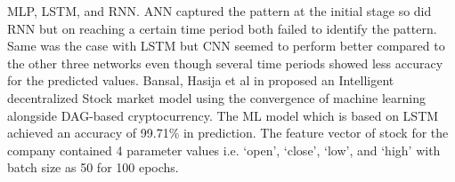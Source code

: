 \documentclass[conference]{IEEEtran}
\begin{document}
MLP, LSTM, and RNN. ANN captured the pattern at the initial stage so did RNN but on reaching a certain time period both failed to identify the pattern. Same was the case with LSTM but CNN seemed to perform better compared to the other three networks even though several time periods showed less accuracy for the predicted values. Bansal, Hasija et al in \cite{b9} proposed an Intelligent decentralized Stock market model using the convergence of machine learning alongside DAG-based cryptocurrency. The ML model which is based on LSTM achieved an accuracy of 99.71\%  in prediction. The feature vector of stock for the company contained 4 parameter values i.e. ‘open’, ‘close’, ‘low’, and ‘high’ with batch size as 50 for 100 epochs.  

\begin{table}[!htbp]
	\caption{Summary of work did by researchers}
	\begin{center}
		\label{research1}
	\end{center}
\end{table}
\end{document}
